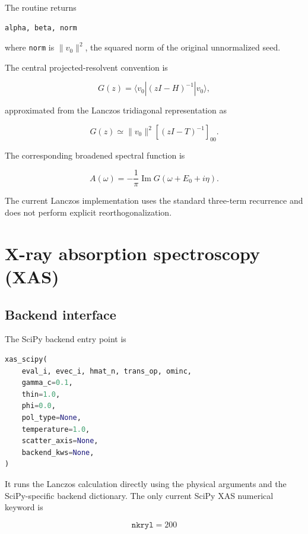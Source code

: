 \documentclass[11pt]{article}
\begin{document}
The routine returns

\begin{lstlisting}
alpha, beta, norm
\end{lstlisting}

where \texttt{norm} is \(\lVert v_0\rVert^2\), the squared norm of the original unnormalized seed.

The central projected-resolvent convention is

\begin{equation}
  G(z)=\langle v_0 |(zI-H)^{-1}|v_0\rangle,
\end{equation}

approximated from the Lanczos tridiagonal representation as

\begin{equation}
  G(z) \simeq \lVert v_0\rVert^2
  \left[(zI-T)^{-1}\right]_{00}.
\end{equation}

The corresponding broadened spectral function is

\begin{equation}
  A(\omega)=-\frac{1}{\pi}\operatorname{Im}
  G(\omega+E_0+i\eta).
\end{equation}

The current Lanczos implementation uses the standard three-term recurrence and does not perform explicit reorthogonalization.

\section{X-ray absorption spectroscopy (XAS)}

\subsection{Backend interface}

The SciPy backend entry point is

\begin{lstlisting}[language=Python]
xas_scipy(
    eval_i, evec_i, hmat_n, trans_op, ominc,
    gamma_c=0.1,
    thin=1.0,
    phi=0.0,
    pol_type=None,
    temperature=1.0,
    scatter_axis=None,
    backend_kws=None,
)
\end{lstlisting}

It runs the Lanczos calculation directly using the physical arguments and the SciPy-specific backend dictionary. The only current SciPy XAS numerical keyword is

\begin{equation}
  \texttt{nkryl}=200
\end{equation}
\end{document}
